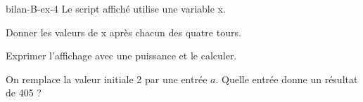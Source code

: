 \begin{blocEdition}{bilan-B-ex-4}
Le script affiché utilise une variable x.\begin{questions}
\item Donner les valeurs de x après chacun des quatre tours.
\item Exprimer l’affichage avec une puissance et le calculer.
\item On remplace la valeur initiale 2 par une entrée $a$. Quelle entrée donne un résultat de 405 ?
\end{questions}\label{fig-bilan-B-ex-4}
\par{}\par\par{}\par{}\par{}\par{}\par{}\par{}
\end{blocEdition}
